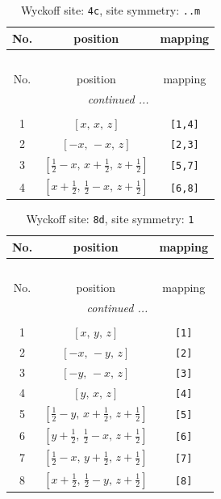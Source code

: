 \documentclass[fleqn,8pt]{jsarticle}
\begin{document}
\renewcommand{\arraystretch}{1.2}
\begin{longtable}{ccc}
\caption{Wyckoff site: {\tt 4c}, site symmetry: {\tt ..m}}
 \\
 \hline \hline
No. & position & mapping \\ \hline \endfirsthead

\multicolumn{2}{l}{\tablename\ \thetable{}} \\
 \hline \hline
No. & position & mapping \\ \hline \endhead

 \hline \hline
\multicolumn{2}{r}{\footnotesize\it continued ...} \\ \endfoot

 \hline \hline
\multicolumn{2}{r}{} \\ \endlastfoot

1 & $\left[ x,\, x,\, z \right]$ & {\tt [1,4]} \\ \hline
2 & $\left[ - x,\, - x,\, z \right]$ & {\tt [2,3]} \\ \hline
3 & $\left[ \frac{1}{2} - x,\, x + \frac{1}{2},\, z + \frac{1}{2} \right]$ & {\tt [5,7]} \\ \hline
4 & $\left[ x + \frac{1}{2},\, \frac{1}{2} - x,\, z + \frac{1}{2} \right]$ & {\tt [6,8]} \\
\end{longtable}
\renewcommand{\arraystretch}{1.2}
\begin{longtable}{ccc}
\caption{Wyckoff site: {\tt 8d}, site symmetry: {\tt 1}}
 \\
 \hline \hline
No. & position & mapping \\ \hline \endfirsthead

\multicolumn{2}{l}{\tablename\ \thetable{}} \\
 \hline \hline
No. & position & mapping \\ \hline \endhead

 \hline \hline
\multicolumn{2}{r}{\footnotesize\it continued ...} \\ \endfoot

 \hline \hline
\multicolumn{2}{r}{} \\ \endlastfoot

1 & $\left[ x,\, y,\, z \right]$ & {\tt [1]} \\ \hline
2 & $\left[ - x,\, - y,\, z \right]$ & {\tt [2]} \\ \hline
3 & $\left[ - y,\, - x,\, z \right]$ & {\tt [3]} \\ \hline
4 & $\left[ y,\, x,\, z \right]$ & {\tt [4]} \\ \hline
5 & $\left[ \frac{1}{2} - y,\, x + \frac{1}{2},\, z + \frac{1}{2} \right]$ & {\tt [5]} \\ \hline
6 & $\left[ y + \frac{1}{2},\, \frac{1}{2} - x,\, z + \frac{1}{2} \right]$ & {\tt [6]} \\ \hline
7 & $\left[ \frac{1}{2} - x,\, y + \frac{1}{2},\, z + \frac{1}{2} \right]$ & {\tt [7]} \\ \hline
8 & $\left[ x + \frac{1}{2},\, \frac{1}{2} - y,\, z + \frac{1}{2} \right]$ & {\tt [8]} \\
\end{longtable}
\end{document}
